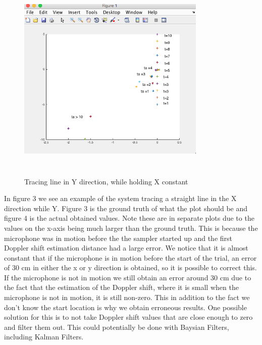\documentclass{acm_proc_article-sp}
\begin{document}
\begin{figure}[h]
\caption{Tracing line in Y direction, while holding X constant}
\includegraphics[width=9cm, height=10cm]{TracingY}
\end{figure}

In figure 3 we see an example of the system tracing a straight line in the X direction while Y. Figure 3 is the ground truth of what the plot should be and figure 4 is the actual obtained values. Note these are in separate plots due to the values on the x-axis being much larger than the ground truth. This is because the microphone was in motion before the the sampler started up and the first Doppler shift estimation distance had a large error. We notice that it is almost constant that if the microphone is in motion before the start of the trial, an error of 30 cm in either the x or y direction is obtained, so it is possible to correct this. If the microphone is not in motion we still obtain an error around 30 cm due to the fact that the estimation of the Doppler shift, where it is small when the microphone is not in motion, it is still non-zero. This in addition to the fact we don't know the start location is why we obtain erroneous results. One possible solution for this is to not take Doppler shift values that are close enough to zero and filter them out. This could potentially be done with Baysian Filters, including Kalman Filters. 
\end{document}
